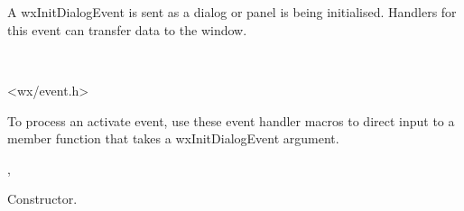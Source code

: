 \section{}\label{wxinitdialogevent}

A wxInitDialogEvent is sent as a dialog or panel is being initialised.
Handlers for this event can transfer data to the window.


\\


<wx/event.h>


To process an activate event, use these event handler macros to direct input to a member
function that takes a wxInitDialogEvent argument.

\twocolwidtha{7cm}
\begin{twocollist}\itemsep=0pt
\end{twocollist}%


,\rtfsp
{}




Constructor.



